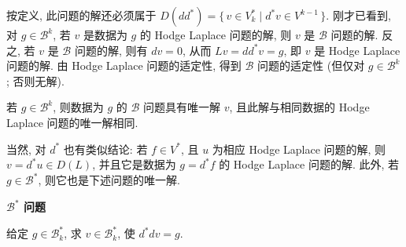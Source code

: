 {按定义, 此问题的解还必须属于 $D(dd^*)=\{\,v\in V_k^*\mid d^*v\in V^{k-1}\,\}$. 刚才已看到, 对 $g\in\mathcal B^k$, 若 $v$ 是数据为 $g$ 的 Hodge Laplace 问题的解, 则 $v$ 是 $\mathcal B$ 问题的解. 反之, 若 $v$ 是 $\mathcal B$ 问题的解, 则有 $dv=0$, 从而 $Lv=dd^*v=g$, 即 $v$ 是 Hodge Laplace 问题的解. 由 Hodge Laplace 问题的适定性, 得到 $\mathcal B$ 问题的适定性 (但仅对 $g\in\mathcal B^k$; 否则无解).}


\begin{Theorem}\label{thm:hodge-boundary-problem}
{若 $g\in\mathcal B^k$, 则数据为 $g$ 的 $\mathcal B$ 问题具有唯一解 $v$, 且此解与相同数据的 Hodge Laplace 问题的唯一解相同.}
\end{Theorem}

{当然, 对 $d^*$ 也有类似结论: 若 $f\in V^*$, 且 $u$ 为相应 Hodge Laplace 问题的解, 则 $v=d^*u\in D(L)$, 并且它是数据为 $g=d^*f$ 的 Hodge Laplace 问题的解. 此外, 若 $g\in\mathcal B^*$, 则它也是下述问题的唯一解.}

\medskip\noindent\textbf{{$\mathcal B^*$ 问题}}\par
{给定 $g\in\mathcal B_k^*$, 求 $v\in\mathcal B_k^*$, 使 $d^*dv=g$.}
